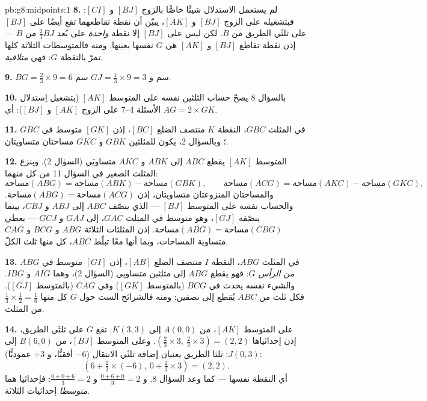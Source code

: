 \begin{solution}{pb:g8:midpoints:1}
\textbf{8.} لم يستعمل الاستدلال شيئًا خاصًّا بالزوج
$[BJ]$ و $[CI]$: فبتشغيله على الزوج $[BJ]$ و $[AK]$، يبيّن أن نقطة
تقاطعهما تقع أيضًا على $[BJ]$ على ثلثَي الطريق من
$B$. لكن ليس على  $[BJ]$ إلا نقطة \emph{واحدة} على
بُعد $\frac23 BJ$ من $B$ --- إذن نقطة تقاطع
$[BJ]$ و $[AK]$ هي $G$ نفسها بعينها. ومنه فالمتوسطات الثلاثة
كلها تمرّ بالنقطة $G$: فهي \emph{متلاقية}.

\textbf{9.} $BG = \frac23 \times 9 = 6$ سم و
$GJ = \frac13 \times 9 = 3$ سم.

\textbf{10.} بالسؤال 8 يصحّ حساب الثلثين نفسه
على المتوسط $[AK]$ (بتشغيل اِستدلال الأسئلة 4--7 على
الزوج $[AK]$ و $[BJ]$): أي $AG = 2 \times GK$.

\textbf{11.} في المثلث $GBC$، النقطة $K$ منتصف
الضلع $[BC]$، إذن $[GK]$ متوسط في $GBC$؛ وبالسؤال
2، يكون للمثلثين $GBK$ و $GKC$ مساحتان متساويتان.

\textbf{12.} المتوسط $[AK]$ يقطع $ABC$ إلى $ABK$ و $AKC$
متساويَي  (السؤال 2). وبنزع المثلث الصغير في السؤال 11
من كل منهما:
\[
\text{مساحة}(ABG) = \text{مساحة}(ABK) - \text{مساحة}(GBK),
\qquad
\text{مساحة}(ACG) = \text{مساحة}(AKC) - \text{مساحة}(GKC),
\]
والمساحتان المنزوعتان متساويتان، إذن
$\text{مساحة}(ABG) = \text{مساحة}(ACG)$. والحساب نفسه
على المتوسط $[BJ]$ --- الذي ينصّف $ABC$ إلى $ABJ$ و
$CBJ$، بينما ينصّفه $[GJ]$، وهو متوسط في المثلث $GAC$،
إلى $GAJ$ و $GCJ$ --- يعطي
$\text{مساحة}(ABG) = \text{مساحة}(CBG)$. إذن المثلثات الثلاثة
$ABG$ و $BCG$ و $CAG$ متساوية المساحات، وبما أنها معًا
تبلّط $ABC$،  كل منها ثلث الكلّ.

\textbf{13.} في المثلث $ABG$، النقطة $I$ منتصف
الضلع $[AB]$، إذن $[GI]$ متوسط في $ABG$ \emph{من
الرأس $G$}: فهو يقطع $ABG$ إلى مثلثين متساويي 
(السؤال 2)، وهما $AIG$ و $IBG$. والشيء نفسه يحدث في $BCG$
(بالمتوسط $[GK]$) وفي $CAG$ (بالمتوسط $[GJ]$). فكل ثلث من
$ABC$ يُقطع إلى نصفين: ومنه فالشرائح الست حول $G$  كل منها
$\frac13 \times \frac12 = \frac16$ من المثلث.

\textbf{14.} على المتوسط $[AK]$، من $A(0,0)$ إلى $K(3,3)$: تقع $G$
على ثلثَي الطريق، إذن إحداثياها
$\left(\frac23 \times 3,\ \frac23 \times 3\right) = (2, 2)$. وعلى
المتوسط $[BJ]$، من $B(6, 0)$ إلى $J(0, 3)$: ثلثا
الطريق يعنيان إضافة ثلثَي الانتقال ($-6$
أفقيًّا، و $+3$ عموديًّا):
\[
\left(6 + \tfrac23 \times (-6),\ 0 + \tfrac23 \times 3\right)
= (2, 2) .
\]
أي النقطة نفسها --- كما وعد السؤال 8. و
$\frac{0 + 6 + 0}{3} = 2$ و $\frac{0 + 0 + 6}{3} = 2$: فإحداثيا  هما \emph{متوسطا} إحداثيات 
الثلاثة.


\end{solution}
